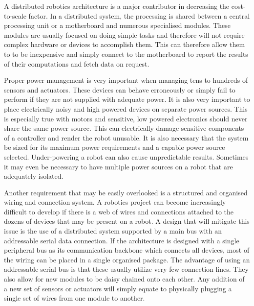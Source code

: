  A distributed robotics architecture is a major contributor in decreasing the cost-to-scale factor. In a distributed system, the processing is shared between a central processing unit or a motherboard and numerous specialised modules. These modules are usually focused on doing simple tasks and therefore will not require complex hardware or devices to accomplish them. This can therefore allow them to to be inexpensive and simply connect to the motherboard to report the results of their computations and fetch data on request.

 Proper power management is very important when managing tens to hundreds of sensors and actuators. These devices can behave erroneously or simply fail to perform if they are not supplied with adequate power. It is also very important to place electrically noisy and high powered devices on separate power sources. This is especially true with motors and sensitive, low powered electronics should never share the same power source. This can electrically damage sensitive components of a controller and render the robot unusable. It is also necessary that the system be sized for its maximum power requirements and a capable power source selected. Under-powering a robot can also cause unpredictable results. Sometimes it may even be necessary to have multiple power sources on a robot that are adequately isolated. 

Another requirement that may be easily overlooked is a structured and organised wiring and connection system. A robotics project can become increasingly difficult to develop if there is a web of wires and connections attached to the dozens of devices that may be present on a robot. A design that will mitigate this issue is the use of a distributed system supported by a main bus with an addressable serial data connection. If the architecture is designed with a single peripheral bus as its communication backbone which connects all devices, most of the wiring can be placed in a single organised package. The advantage of using an addressable serial bus is that these usually utilize very few connection lines. They also allow for new modules to be daisy chained onto each other. Any addition of a new set of sensors or actuators will simply equate to physically plugging a single set of wires from one module to another.

